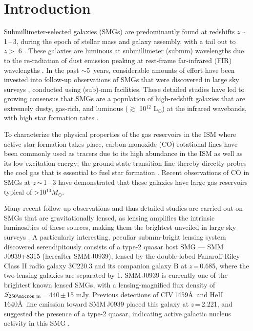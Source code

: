 \documentclass[twocolumn,apj,numberedappendix]{emulateapj}
\newcommand{\Msun}{\mbox{$M_{\odot}$}}
\newcommand{\Lsun}{\mbox{L$_{\odot}$}}
\newcommand{\eg}{{\sl e.g.,~}}
\newcommand{\pmOne}{\mbox{$^{-1}$}}
\begin{document}
\section{Introduction}\label{sec:intro}
Submillimeter-selected galaxies (SMGs) are predominantly found at redshifts $z$\,$\sim$\,1\,--\,3, during the epoch of stellar mass and 
galaxy assembly, with a tail out to $z>$ 6 \citep{Riechers13a}. 
These galaxies are luminous at submillimeter (submm) wavelengths due to the re-radiation of dust emission peaking at 
rest-frame far-infrared (FIR) wavelengths \citep{blain02a}. 
In the past $\sim$5~years, considerable amounts of effort have been invested into follow-up observations of SMGs that were 
discovered in large sky surveys \citep[\eg H-ATLAS, HerMES; ][]{Eales10a,Oliver12a}, conducted using (sub)-mm facilities. These detailed studies have led to growing consensus that SMGs are a population of high-redshift galaxies that are extremely dusty, gas-rich, 
  and luminous ($\gtrsim$ 10$^{12}$ \Lsun) at the infrared wavebands, with high star formation rates \citep[$\gtrsim $ 500 \Msun yr\pmOne; \eg][]{Lagache05a}.
  
  To characterize the physical properties of the gas reservoirs in the ISM where active star formation takes place, carbon monoxide (CO) rotational lines have been commonly used as tracers due to its high abundance in the ISM as well as its low excitation energy; the ground state transition line thereby directly probes the cool gas that is essential to fuel star formation \citep[See \eg][]{Carilli13a}. Recent observations of CO in SMGs at $z$\,$\sim$\,1\,--\,3 have demonstrated that these galaxies have large gas reservoirs typical of \textgreater 10$^{10}$\Msun \citep[\eg][]{Riechers11c,Riechers11d,Ivison11a,Bothwell13a}. 

Many recent follow-up observations and thus detailed studies are carried out on SMGs that are gravitationally lensed,
 as lensing amplifies the intrinsic luminosities of these sources, making them the brightest unveiled in large sky surveys \citep{Negrello10a,Vieira10a,Oliver12a}. 
A particularly interesting, peculiar submm-bright lensing system discovered serendipitously  
consists of a type-2 quasar host SMG --- SMM\,J0939+8315 (hereafter SMM\,J0939), lensed by the double-lobed Fanaroff-Riley 
Class II \citep*[FR-II; ][]{Fanaroff74} radio galaxy 3C220.3 and its
companion galaxy B at $z$\,=\,0.685, where the two lensing galaxies are separated by 1. 
SMM\,J0939 is currently one of the brightest known lensed
SMGs, with a lensing-magnified flux density of $S_\textrm{250\micron m}$\,=\,440\,$\pm$\,15 mJy. 
Previous detections of CIV\,1459\AA\
 and HeII\,1640\AA\ line emission toward SMM\,J0939 
 placed this galaxy at $z$\,=\,2.221, and suggested the presence of a type-2 quasar,  
indicating active galactic nucleus activity in this SMG \citep[hereafter H14]{Haas14}. 
\end{document}
